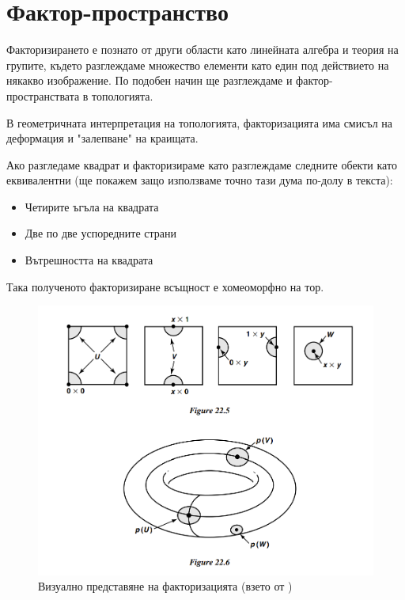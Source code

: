 \section{Фактор-пространство}
Факторизирането е познато от други области като линейната алгебра и теория на групите, където разглеждаме множество елементи като един под действието на някакво изображение. По подобен начин ще разглеждаме и фактор-пространствата в топологията.

В геометричната интерпретация на топологията, факторизацията има смисъл на деформация и "залепване" на краищата.

\begin{example}
    Ако разгледаме квадрат и факторизираме като разглеждаме следните обекти като еквивалентни (ще покажем защо използваме точно тази дума по-долу в текста):

    \begin{itemize}
        \item Четирите ъгъла на квадрата
        \item Две по две успоредните страни
        \item Вътрешността на квадрата
    \end{itemize}

    Така полученото факторизиране всъщност е хомеоморфно на тор.
    \begin{figure}[H]
        \centering
        \includegraphics[width=\textwidth]{resources/torus.png}
        \caption{Визуално представяне на факторизацията (взето от \cite[стр.~140]{munkrestopology})}
    \end{figure}
\end{example}

